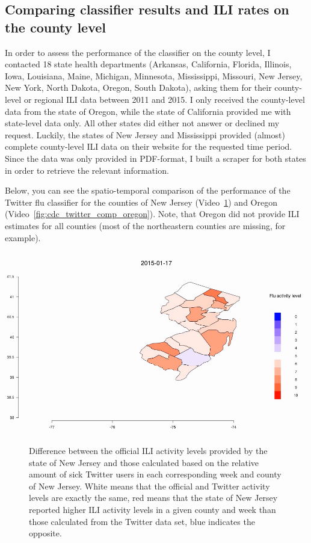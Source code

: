 \documentclass[11pt, a4paper,twoside]{report}\usepackage[]{graphicx}\usepackage[]{color}
\begin{document}
\subsection{Comparing classifier results and ILI rates on the county level}
\label{sec:comp_cdc_county}
In order to assess the performance of the classifier on the county level, I contacted 18 state health departments (Arkansas, California, Florida, Illinois, Iowa, Louisiana, Maine, Michigan, Minnesota, Mississippi, Missouri, New Jersey, New York, North Dakota, Oregon, South Dakota), asking them for their county-level or regional ILI data between 2011 and 2015. I only received the county-level data from the state of Oregon, while the state of California provided me with state-level data only. All other states did either not answer or declined my request. Luckily, the states of New Jersey and Mississippi provided (almost) complete county-level ILI data on their website for the requested time period. Since the data was only provided in PDF-format, I built a scraper for both states in order to retrieve the relevant information. 

Below, you can see the spatio-temporal comparison of the performance of the Twitter flu classifier for the counties of New Jersey (Video~\ref{fig:cdc_twitter_comp_jersey}) and Oregon (Video~\ref{fig:cdc_twitter_comp_oregon}). Note, that Oregon did not provide ILI estimates for all counties (most of the northeastern counties are missing, for example).

\begin{center}
\href{run:vids/5_cdc_twitter_diff_user_jersey.avi}{\includegraphics[width=0.9\linewidth]{vids/5_cdc_twitter_diff_user_jersey.png}}
\end{center}
\vspace{-0.2in}
\begin{figure}[htbp!]
\centering
  \caption{Difference between the official ILI activity levels provided by the state of New Jersey and those calculated based on the relative amount of sick Twitter users in each corresponding week and county of New Jersey. White means that the official and Twitter activity levels are exactly the same, red means that the state of New Jersey reported higher ILI activity levels in a given county and week than those calculated from the Twitter data set, blue indicates the opposite.}
    \label{fig:cdc_twitter_comp_jersey}
\end{figure}
\end{document}
